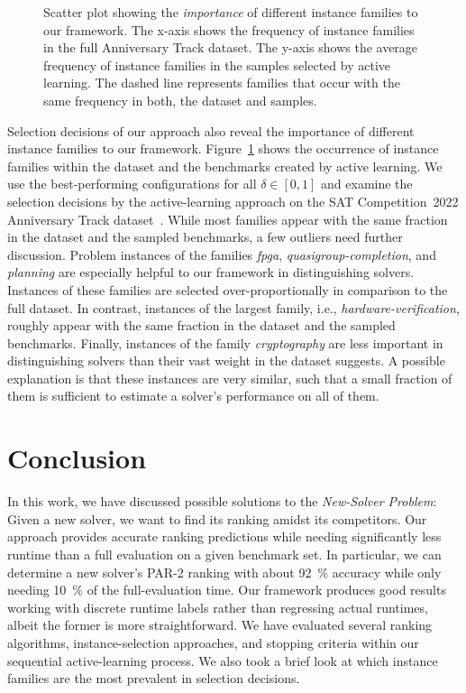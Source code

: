 \documentclass[runningheads]{llncs}
\begin{document}
\begin{figure}[tb!]
  \centering
  \caption{
    Scatter plot showing the \emph{importance} of different instance families to our framework.
    The x-axis shows the frequency of instance families in the full Anniversary Track dataset.
    The y-axis shows the average frequency of instance families in the samples selected by active learning.
    The dashed line represents families that occur with the same frequency in both, the dataset and samples.
  }
  \label{fig:annifinalfamilies}
\end{figure}

Selection decisions of our approach also reveal the importance of different instance families to our framework.
Figure~\ref{fig:annifinalfamilies} shows the occurrence of instance families within the dataset and the benchmarks created by active learning.
We use the best-performing configurations for all $\delta \in \left[0, 1\right]$ and examine the selection decisions by the active-learning approach on the SAT Competition~2022 Anniversary Track dataset~\cite{sat2022}.
While most families appear with the same fraction in the dataset and the sampled benchmarks, a few outliers need further discussion.
Problem instances of the families \emph{fpga}, \emph{quasigroup-completion}, and \emph{planning} are especially helpful to our framework in distinguishing solvers.
Instances of these families are selected over-proportionally in comparison to the full dataset.
In contrast, instances of the largest family, i.e., \emph{hardware-verification}, roughly appear with the same fraction in the dataset and the sampled benchmarks.
Finally, instances of the family \emph{cryptography} are less important in distinguishing solvers than their vast weight in the dataset suggests.
A possible explanation is that these instances are very similar, such that a small fraction of them is sufficient to estimate a solver's performance on all of them.

\section{Conclusion}

In this work, we have discussed possible solutions to the \emph{New-Solver Problem}:
Given a new solver, we want to find its ranking amidst its competitors.
Our approach provides accurate ranking predictions while needing significantly less runtime than a full evaluation on a given benchmark set.
In particular, we can determine a new solver's PAR-2 ranking with about \SI{92}{\%} accuracy while only needing \SI{10}{\%} of the full-evaluation time.
Our framework produces good results working with discrete runtime labels rather than regressing actual runtimes, albeit the former is more straightforward.
We have evaluated several ranking algorithms, instance-selection approaches, and stopping criteria within our sequential active-learning process.
We also took a brief look at which instance families are the most prevalent in selection decisions.
\end{document}
